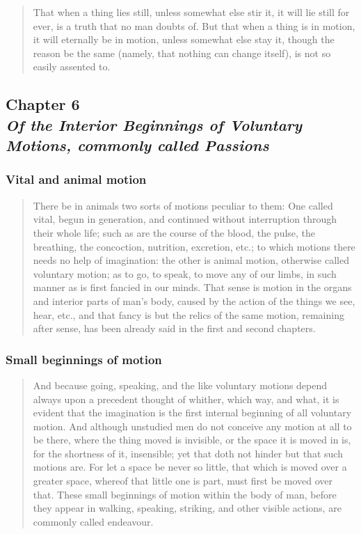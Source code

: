             \begin{quote}
                That when a thing lies still, unless somewhat else stir it, it will lie still for ever, is a truth that no man doubts of. But that when a thing is in motion, it will eternally be in motion, unless somewhat else stay it, though the reason be the same (namely, that nothing can change itself), is not so easily assented to.
            \end{quote}

    \subsection[Of the Interior Beginnings of Voluntary Motions, commonly called Passions]{Chapter 6 \\ \textit{Of the Interior Beginnings of Voluntary Motions, commonly called Passions}}

        \subsubsection{Vital and animal motion}

            \begin{quote}
                There be in animals two sorts of motions peculiar to them: One called vital, begun in generation, and continued without interruption through their whole life; such as are the course of the blood, the pulse, the breathing, the concoction, nutrition, excretion, etc.; to which motions there needs no help of imagination: the other is animal motion, otherwise called voluntary motion; as to go, to speak, to move any of our limbs, in such manner as is first fancied in our minds. That sense is motion in the organs and interior parts of man’s body, caused by the action of the things we see, hear, etc., and that fancy is but the relics of the same motion, remaining after sense, has been already said in the first and second chapters.
            \end{quote} 

        \subsubsection{Small beginnings of motion}

            \begin{quote}
                And because going, speaking, and the like voluntary motions depend always upon a precedent thought of whither, which way, and what, it is evident that the imagination is the first internal beginning of all voluntary motion. And although unstudied men do not conceive any motion at all to be there, where the thing moved is invisible, or the space it is moved in is, for the shortness of it, insensible; yet that doth not hinder but that such motions are. For let a space be never so little, that which is moved over a greater space, whereof that little one is part, must first be moved over that. These small beginnings of motion within the body of man, before they appear in walking, speaking, striking, and other visible actions, are commonly called endeavour.
            \end{quote}

